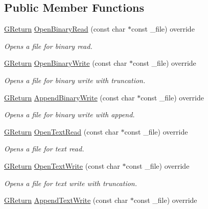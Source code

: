 \subsection*{Public Member Functions}
\begin{DoxyCompactItemize}
\item 
\hyperlink{namespaceGW_a67a839e3df7ea8a5c5686613a7a3de21}{G\+Return} \hyperlink{classFileIO_a0adeb88dd23bb5897e8315ab0029c835}{Open\+Binary\+Read} (const char $\ast$const \+\_\+file) override
\begin{DoxyCompactList}\small\item\em Opens a file for binary read. \end{DoxyCompactList}\item 
\hyperlink{namespaceGW_a67a839e3df7ea8a5c5686613a7a3de21}{G\+Return} \hyperlink{classFileIO_a5cd87c21a72ae2dba21a9f3e50841e6e}{Open\+Binary\+Write} (const char $\ast$const \+\_\+file) override
\begin{DoxyCompactList}\small\item\em Opens a file for binary write with truncation. \end{DoxyCompactList}\item 
\hyperlink{namespaceGW_a67a839e3df7ea8a5c5686613a7a3de21}{G\+Return} \hyperlink{classFileIO_ab26fc846b30446edf28ac922759c9e5e}{Append\+Binary\+Write} (const char $\ast$const \+\_\+file) override
\begin{DoxyCompactList}\small\item\em Opens a file for binary write with append. \end{DoxyCompactList}\item 
\hyperlink{namespaceGW_a67a839e3df7ea8a5c5686613a7a3de21}{G\+Return} \hyperlink{classFileIO_a3d93902abce1baec299cd63891798681}{Open\+Text\+Read} (const char $\ast$const \+\_\+file) override
\begin{DoxyCompactList}\small\item\em Opens a file for text read. \end{DoxyCompactList}\item 
\hyperlink{namespaceGW_a67a839e3df7ea8a5c5686613a7a3de21}{G\+Return} \hyperlink{classFileIO_a4e51443206e9cf97dcac28719dbeb23e}{Open\+Text\+Write} (const char $\ast$const \+\_\+file) override
\begin{DoxyCompactList}\small\item\em Opens a file for text write with truncation. \end{DoxyCompactList}\item 
\hyperlink{namespaceGW_a67a839e3df7ea8a5c5686613a7a3de21}{G\+Return} \hyperlink{classFileIO_afd4e0d14b85d8c0aded66bd946c291f4}{Append\+Text\+Write} (const char $\ast$const \+\_\+file) override

\end{DoxyCompactItemize}
